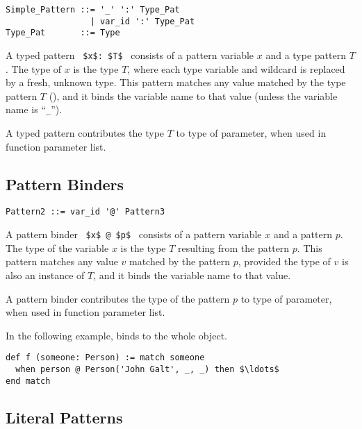 \syntax\begin{lstlisting}
Simple_Pattern ::= '_' ':' Type_Pat
                 | var_id ':' Type_Pat
Type_Pat       ::= Type
\end{lstlisting}

A typed pattern ~\lstinline!$x$: $T$!~ consists of a pattern variable $x$ and a type pattern $T$. The type of $x$ is the type $T$, where each type variable and wildcard is replaced by a fresh, unknown type. This pattern matches any value matched by the type pattern $T$ (), and it binds the variable name to that value (unless the variable name is ``\lstinline!_!''). 

A typed pattern contributes the type $T$ to type of parameter, when used in function parameter list. 






\subsection{Pattern Binders}
\label{sec:pattern-binders}

\syntax\begin{lstlisting}
Pattern2 ::= var_id '@' Pattern3
\end{lstlisting}

A pattern binder ~\lstinline!$x$ @ $p$!~ consists of a pattern variable $x$ and a pattern $p$. The type of the variable $x$ is the type $T$ resulting from the pattern $p$. This pattern matches any value $v$ matched by the pattern $p$, provided the type of $v$ is also an instance of $T$, and it binds the variable name to that value. 

A pattern binder contributes the type of the pattern $p$ to type of parameter, when used in function parameter list. 

\example In the following example,  binds to the whole  object. 
\begin{lstlisting}
def f (someone: Person) := match someone
  when person @ Person('John Galt', _, _) then $\ldots$
end match
\end{lstlisting}







\subsection{Literal Patterns}
\label{sec:literal-patterns}


